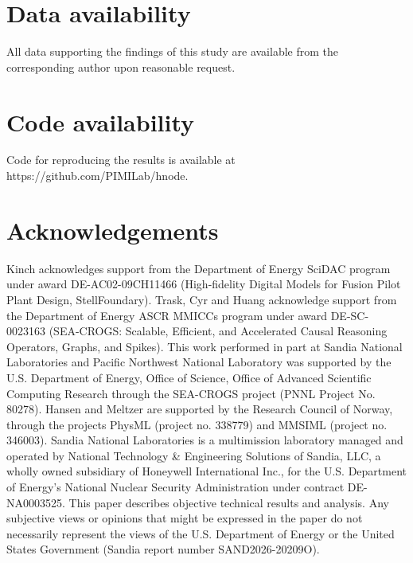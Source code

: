 \documentclass[12pt]{article}
\begin{document}

\section{Data availability}
All data supporting the findings of this study are available from the corresponding author upon reasonable request.

\section{Code availability}
Code for reproducing the results is available at https://github.com/PIMILab/hnode.

\section{Acknowledgements}
Kinch acknowledges support from the Department of Energy SciDAC program under award DE-AC02-09CH11466 (High-fidelity Digital Models for Fusion Pilot Plant Design, StellFoundary). Trask, Cyr and Huang acknowledge support from the Department of Energy ASCR MMICCs program under award DE-SC-0023163 (SEA-CROGS: Scalable, Efficient, and Accelerated Causal Reasoning Operators, Graphs, and Spikes).  This work performed in part at Sandia National Laboratories and Pacific Northwest National Laboratory was supported by the U.S. Department of Energy, Office of Science, Office of Advanced Scientific Computing Research through the SEA-CROGS project (PNNL Project No. 80278).
Hansen and Meltzer are supported by the Research Council of Norway, through the projects PhysML (project no. 338779) and MMSIML (project no. 346003).
Sandia National Laboratories is a multimission laboratory managed and operated by National Technology \& Engineering Solutions of Sandia, LLC, a wholly owned subsidiary of Honeywell International Inc., for the U.S. Department of Energy’s National Nuclear Security Administration under contract DE-NA0003525. This paper describes objective technical results and analysis. Any subjective views or opinions that might be expressed in the paper do not necessarily represent the views of the U.S. Department of Energy or the United States Government (Sandia report number SAND2026-20209O).
\end{document}
